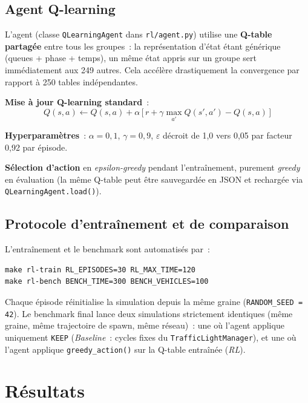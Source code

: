 \documentclass[a4paper,10pt]{article}
\begin{document}
\subsection{Agent Q-learning}

L'agent (classe \texttt{QLearningAgent} dans \texttt{rl/agent.py}) utilise
une \textbf{Q-table partag\'{e}e} entre tous les groupes~: la repr\'{e}sentation
d'\'{e}tat \'{e}tant g\'{e}n\'{e}rique (queues + phase + temps), un m\^{e}me \'{e}tat appris
sur un groupe sert imm\'{e}diatement aux 249 autres. Cela acc\'{e}l\`{e}re
drastiquement la convergence par rapport \`{a} 250 tables ind\'{e}pendantes.

\textbf{Mise \`{a} jour Q-learning standard}~:
\[
  Q(s,a) \leftarrow Q(s,a) + \alpha \,\bigl[\,r + \gamma \max_{a'} Q(s',a') - Q(s,a)\,\bigr]
\]

\textbf{Hyperparam\`{e}tres}~: $\alpha = 0{,}1$, $\gamma = 0{,}9$,
$\varepsilon$ d\'{e}croit de 1{,}0 vers 0{,}05 par facteur 0{,}92 par \'{e}pisode.

\textbf{S\'{e}lection d'action} en \emph{epsilon-greedy} pendant l'entra\^{i}nement,
purement \emph{greedy} en \'{e}valuation (la m\^{e}me Q-table peut \^{e}tre
sauvegard\'{e}e en JSON et recharg\'{e}e via \texttt{QLearningAgent.load()}).

\subsection{Protocole d'entra\^{i}nement et de comparaison}

L'entra\^{i}nement et le benchmark sont automatis\'{e}s par~:
\begin{lstlisting}
make rl-train RL_EPISODES=30 RL_MAX_TIME=120
make rl-bench BENCH_TIME=300 BENCH_VEHICLES=100
\end{lstlisting}

Chaque \'{e}pisode r\'{e}initialise la simulation depuis la m\^{e}me graine
(\texttt{RANDOM\_SEED\,=\,42}). Le benchmark final lance deux simulations
strictement identiques (m\^{e}me graine, m\^{e}me trajectoire de spawn,
m\^{e}me r\'{e}seau)~: une o\`{u} l'agent applique uniquement \texttt{KEEP}
(\textit{Baseline}~: cycles fixes du \texttt{TrafficLightManager}), et
une o\`{u} l'agent applique \texttt{greedy\_action()} sur la Q-table
entra\^{i}n\'{e}e (\textit{RL}).

\section{R\'{e}sultats}
\end{document}
